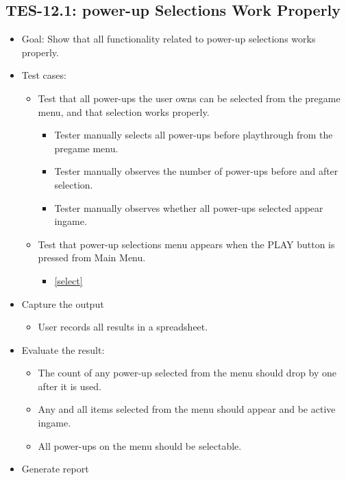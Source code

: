 \subsection{TES-12.1: power-up Selections Work Properly }
\label{power-ups}
\begin{itemize}
\item Goal: Show that all functionality related to power-up selections works properly. 
\item Test cases: 

\begin{itemize}
\item Test that all power-ups the user owns can be selected from the pregame menu, and that selection works properly.
\begin{itemize}
\item Tester manually selects all power-ups before playthrough from the pregame menu.
\item Tester manually observes the number of power-ups before and after selection.
\item Tester manually observes whether all power-ups selected appear ingame.
\end{itemize}
\item Test that power-up selections menu appears when the PLAY button is pressed from Main Menu.
\begin{itemize}
\item \ref{select}
\end{itemize}
\end{itemize}
\item Capture the output 
\begin{itemize}
\item User records all results in a spreadsheet.
\end{itemize}
\item Evaluate the result: 

\begin{itemize}
\item The count of any power-up selected from the menu should drop by one after it is used.
\item Any and all items selected from the menu should appear and be active ingame.
\item All power-ups on the menu should be selectable.
\end{itemize}
\item Generate report 
\end{itemize}

